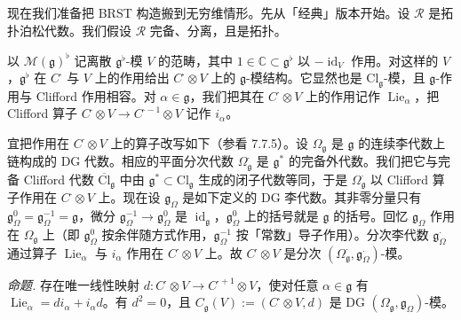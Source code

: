  现在我们准备把 BRST 构造搬到无穷维情形。先从「经典」版本开始。设 $\mathcal{R}$ 是拓扑泊松代数。我们假设 $\mathcal{R}$ 完备、分离，且是拓扑。


 以 $\mathcal{M}(\mathfrak{g})^{\flat}$ 记离散 $\mathfrak{g}^{\flat}$-模 $V$ 的范畴，其中 $1\in\mathbb{C}\subset\mathfrak{g}^{\flat}$ 以 $-\operatorname{id}_{V}$ 作用。对这样的 $V$，$\mathfrak{g}^{\flat}$ 在 $C^{\cdot}$ 与 $V$ 上的作用给出 $C^{\cdot}\otimes V$ 上的 $\mathfrak{g}$-模结构。它显然也是 $\mathrm{Cl}_{\mathfrak{g}}$-模，且 $\mathfrak{g}$-作用与 Clifford 作用相容。对 $\alpha\in\mathfrak{g}$，我们把其在 $C^{\cdot}\otimes V$ 上的作用记作 $\operatorname{Lie}_{\alpha}$，把 Clifford 算子 $C^{\cdot}\otimes V\to C^{\cdot-1}\otimes V$ 记作 $i_{\alpha}$。

宜把作用在 $C^{\cdot}\otimes V$ 上的算子改写如下（参看 7.7.5）。设 $\Omega_{\mathfrak{g}}$ 是 $\mathfrak{g}$ 的连续李代数上链构成的 DG 代数。相应的平面分次代数 $\Omega^{\cdot}_{\mathfrak{g}}$ 是 $\mathfrak{g}^{*}$ 的完备外代数。我们把它与完备 Clifford 代数 $\overline{\mathrm{Cl}}_{\mathfrak{g}}$ 中由 $\mathfrak{g}^{*}\subset\mathrm{Cl}_{\mathfrak{g}}$ 生成的闭子代数等同，于是 $\Omega^{\cdot}_{\mathfrak{g}}$ 以 Clifford 算子作用在 $C^{\cdot}\otimes V$ 上。现在设 $\mathfrak{g}_{\Omega}$ 是如下定义的 DG 李代数。其非零分量只有 $\mathfrak{g}^{0}_{\Omega}=\mathfrak{g}^{-1}_{\Omega}=\mathfrak{g}$，微分 $\mathfrak{g}^{-1}_{\Omega}\to\mathfrak{g}^{0}_{\Omega}$ 是 $\operatorname{id}_{\mathfrak{g}}$，$\mathfrak{g}^{0}_{\Omega}$ 上的括号就是 $\mathfrak{g}$ 的括号。回忆 $\mathfrak{g}_{\Omega}$ 作用在 $\Omega_{\mathfrak{g}}$ 上（即 $\mathfrak{g}^{0}_{\Omega}$ 按余伴随方式作用，$\mathfrak{g}^{-1}_{\Omega}$ 按「常数」导子作用）。分次李代数 $\mathfrak{g}^{\cdot}_{\Omega}$ 通过算子 $\operatorname{Lie}_{\alpha}$ 与 $i_{\alpha}$ 作用在 $C^{\cdot}\otimes V$ 上。故 $C^{\cdot}\otimes V$ 是分次 $(\Omega^{\cdot}_{\mathfrak{g}},\mathfrak{g}^{\cdot}_{\Omega})$-模。

 \emph{命题.} 存在唯一线性映射 $d:C^{\cdot}\otimes V\to C^{\cdot+1}\otimes V$，使对任意 $\alpha\in\mathfrak{g}$ 有 $\operatorname{Lie}_{\alpha}=di_{\alpha}+i_{\alpha}d$。有 $d^{2}=0$，且 $C_{\mathfrak{g}}(V):=(C^{\cdot}\otimes V,d)$ 是 DG $(\Omega_{\mathfrak{g}},\mathfrak{g}_{\Omega})$-模。

